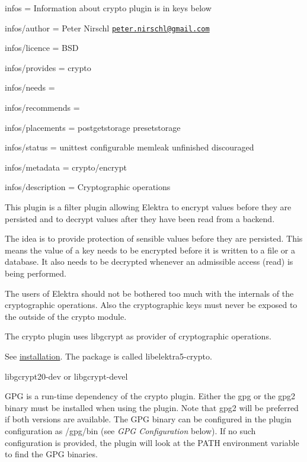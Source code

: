 
\begin{DoxyItemize}
\item infos = Information about crypto plugin is in keys below
\item infos/author = Peter Nirschl \href{mailto:peter.nirschl@gmail.com}{\tt peter.\+nirschl@gmail.\+com}
\item infos/licence = B\+SD
\item infos/provides = crypto
\item infos/needs =
\item infos/recommends =
\item infos/placements = postgetstorage presetstorage
\item infos/status = unittest configurable memleak unfinished discouraged
\item infos/metadata = crypto/encrypt
\item infos/description = Cryptographic operations
\end{DoxyItemize}

This plugin is a filter plugin allowing Elektra to encrypt values before they are persisted and to decrypt values after they have been read from a backend.

The idea is to provide protection of sensible values before they are persisted. This means the value of a key needs to be encrypted before it is written to a file or a database. It also needs to be decrypted whenever an admissible access (read) is being performed.

The users of Elektra should not be bothered too much with the internals of the cryptographic operations. Also the cryptographic keys must never be exposed to the outside of the crypto module.

The crypto plugin uses libgcrypt as provider of cryptographic operations.

See \hyperlink{doc_INSTALL_md}{installation}. The package is called {\ttfamily libelektra5-\/crypto}.


\begin{DoxyItemize}
\item {\ttfamily libgcrypt20-\/dev} or {\ttfamily libgcrypt-\/devel}
\end{DoxyItemize}

G\+PG is a run-\/time dependency of the crypto plugin. Either the {\ttfamily gpg} or the {\ttfamily gpg2} binary must be installed when using the plugin. Note that {\ttfamily gpg2} will be preferred if both versions are available. The G\+PG binary can be configured in the plugin configuration as {\ttfamily /gpg/bin} (see {\itshape G\+PG Configuration} below). If no such configuration is provided, the plugin will look at the P\+A\+TH environment variable to find the G\+PG binaries.

